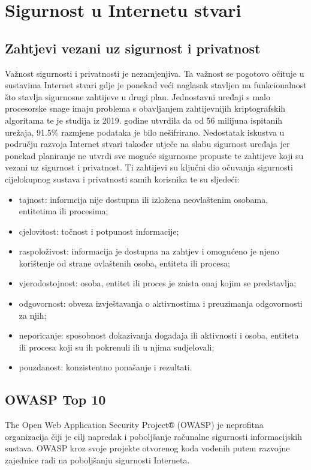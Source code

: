 \documentclass[times, utf8, diplomski]{fer}
\begin{document}
\chapter{Sigurnost u Internetu stvari}
\section{Zahtjevi vezani uz sigurnost i privatnost}
Važnost sigurnosti i privatnosti je nezamjenjiva. Ta važnost se pogotovo očituje u sustavima Internet stvari gdje je ponekad veći naglasak stavljen na funkcionalnost što stavlja sigurnosne zahtijeve u drugi plan. Jednostavni uređaji s malo procesorske snage imaju problema s obavljanjem zahtijevnijih kriptografskih algoritama te je studija iz 2019. godine utvrdila da od 56 milijuna ispitanih urežaja, 91.5\% razmjene podataka je bilo nešifrirano\citep{Greene2019May}. Nedostatak iskustva u području razvoja Internet stvari također utječe na slabu sigurnost uređaja jer ponekad planiranje ne utvrdi sve moguće sigurnosne propuste te zahtijeve koji su vezani uz sigurnost i privatnost. Ti zahtijevi su ključni dio očuvanja sigurnosti cijelokupnog sustava i privatnosti samih korisnika te su sljedeći:  
\citep{InternetStvari}

\begin{itemize}
    \item tajnost: informcija nije dostupna ili izložena  neovlaštenim osobama, entitetima ili procesima;
    \item cjelovitost: točnost i potpunost informacije;
    \item raspoloživost: informacija je dostupna na zahtjev i omogućeno je njeno korištenje od strane ovlaštenih osoba, entiteta ili procesa;
    \item vjerodostojnost: osoba, entitet ili proces je zaista onaj kojim se predstavlja;
    \item odgovornost: obveza izvještavanja o aktivnostima i preuzimanja odgovornosti za njih;
    \item neporicanje: sposobnost dokazivanja događaja ili aktivnosti i osoba, entiteta ili procesa koji su ih pokrenuli ili u njima sudjelovali;
    \item pouzdanost: konzistentno ponašanje i rezultati.
\end{itemize}

\section{OWASP Top 10}
The Open Web Application Security Project® (OWASP) je neprofitna organizacija čiji je cilj napredak i poboljšanje računalne sigurnosti informacijskih sustava. OWASP kroz svoje projekte otvorenog koda vođenih putem razvojne zajednice radi na poboljšanju sigurnosti Interneta.
\end{document}
